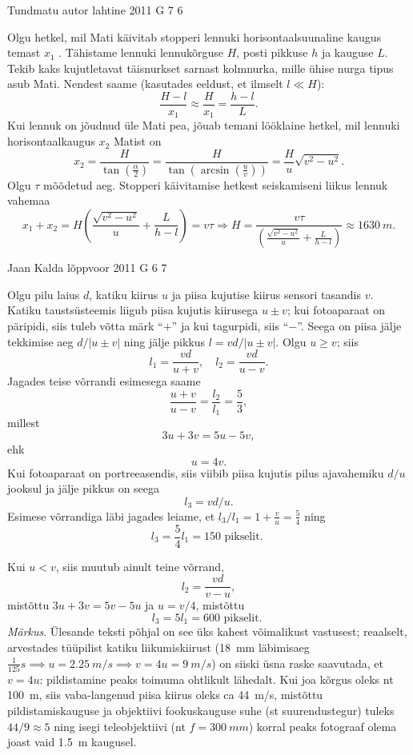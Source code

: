 \documentclass[11pt]{article}
\begin{document}
{%
{Tundmatu autor} %
{lahtine} %
{2011} %
{G 7} %
{6} %
{

\ifSolution
Olgu hetkel, mil Mati käivitab stopperi lennuki horisontaalsuunaline kaugus
temast $x_{1}$ . Tähistame lennuki lennukõrguse $H$, posti pikkuse $h$ ja
kauguse
$L$. Tekib kaks kujutletavat täisnurkset sarnast kolmnurka, mille ühise nurga
tipus asub Mati. Nendest saame (kasutades eeldust, et ilmselt $l\ll H$):
\[\frac{H-l}{x_{1}}\approx\frac{H}{x_{1}}=\frac{h-l}{L}. \]
Kui lennuk on jõudnud üle Mati pea, jõuab temani lööklaine hetkel, mil lennuki horisontaalkaugus $x_{2}$ Matist on
\[ x_{2}=\frac{H}{\tan\left(\frac{\alpha}{2}\right)}=\frac{H}{\tan\left(\arcsin\left(\frac{u}{v}\right)\right)}=\frac{H}{u}\sqrt{v^2-u^2}.
\]
Olgu $\tau$ mõõdetud aeg. Stopperi käivitamise hetkest seiskamiseni liikus lennuk vahemaa
\[ x_1+x_2=H\left(\frac{\sqrt{v^2-u^2}}{u} +\frac{L}{h-l}\right)=v\tau
\Rightarrow
H=\frac{v\tau}{\left(\frac{\sqrt{v^2-u^2}}{u} +\frac{L}{h-l}\right)}\approx
\SI{1630}{m}.
\]
\fi
}

{Jaan Kalda} %
{lõppvoor} %
{2011} %
{G 6} %
{7} %
{

\ifSolution
Olgu pilu laius $d$, katiku kiirus $u$ ja piisa kujutise kiirus sensori tasandis $v$. Katiku
taustsüsteemis liigub piisa kujutis kiirusega $u \pm v$; kui fotoaparaat on päripidi, siis tuleb võtta märk \enquote{$+$} ja kui tagurpidi, siis \enquote{$-$}. Seega on piisa jälje tekkimise aeg
$d/|u \pm v|$ ning jälje pikkus $l = vd/|u \pm v|$. Olgu $u \geq v$; siis
\[
l_{1}=\frac{v d}{u+v}, \quad l_{2}=\frac{v d}{u-v}.
\]
Jagades teise võrrandi esimesega saame 
\[
\frac{u+v}{u-v}=\frac{l_{2}}{l_{1}}=\frac{5}{3},
\]
millest
\[
3u+ 3v = 5u-5v,
\]
ehk
\[
u = 4v.
\]
Kui fotoaparaat on portreeasendis, siis viibib piisa kujutis pilus ajavahemiku
$d/u$ jooksul ja jälje pikkus on seega
\[
l_3 = vd/u.
\]
Esimese võrrandiga läbi jagades leiame, et $l_3/l_1 = 1 + \frac{v}{u} = \frac{5}{4}$
ning
\[
l_{3}=\frac{5}{4} l_{1}=150 \text { pikselit. }
\]

Kui $u < v$, siis muutub ainult teine võrrand,
\[
l_2 = \frac{vd}{v - u},
\]
mistõttu $3u + 3v = 5v - 5u$ ja $u = v/4$, mistõttu
\[
l_{3}=5 l_{1}=600 \text { pikselit. }
\]
\emph{Märkus}. Ülesande teksti põhjal on see üks kahest võimalikust vastusest; reaalselt, arvestades tüüpilist katiku liikumiskiirust (\SI{18}{mm} läbimisaeg $\frac{1}{125}\si{s} \implies u = \SI{2,25}{m/s} \implies v = 4u = \SI{9}{m/s}$) on siiski üsna raske saavutada, et $v = 4u$: pildistamine peaks toimuma ohtlikult lähedalt. Kui joa kõrgus oleks nt \SI{100}{m}, siis vaba-langenud piisa
kiirus oleks ca \SI{44}{m/s}, mistõttu pildistamiskauguse ja objektiivi fookuskauguse suhe
(st suurendustegur) tuleks $44/9 \approx 5$ ning isegi teleobjektiivi (nt $f = \SI{300}{mm}$) korral
peaks fotograaf olema joast vaid \SI{1,5}{m} kaugusel.

}}
\end{document}
